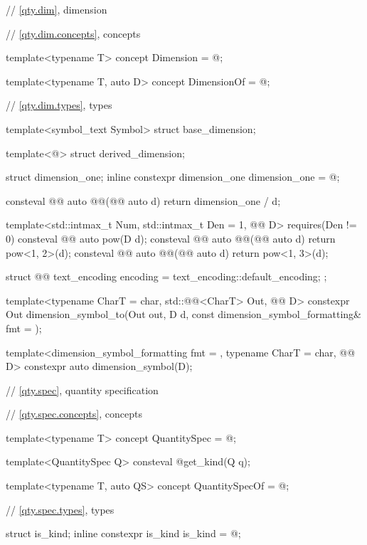 \begin{codeblock}
{// \ref{qty.dim}, dimension

// \ref{qty.dim.concepts}, concepts

template<typename T>
concept Dimension = @\seebelownc@;

template<typename T, auto D>
concept DimensionOf = @\seebelownc@;

// \ref{qty.dim.types}, types

template<symbol_text Symbol>
struct base_dimension;

template<@\seebelownc@>
struct derived_dimension;

struct dimension_one;
inline constexpr dimension_one dimension_one = @\seebelownc@;

consteval @@ auto @@(@@ auto d) { return dimension_one / d; }

template<std::intmax_t Num, std::intmax_t Den = 1, @@ D>
  requires(Den != 0)
consteval @@ auto pow(D d);
consteval @@ auto @@(@@ auto d) { return pow<1, 2>(d); }
consteval @@ auto @@(@@ auto d) { return pow<1, 3>(d); }

struct @@ {
  text_encoding encoding = text_encoding::default_encoding;
};

template<typename CharT = char, std::@@<CharT> Out, @@ D>
constexpr Out dimension_symbol_to(Out out, D d, const dimension_symbol_formatting& fmt = {});

template<dimension_symbol_formatting fmt = {}, typename CharT = char, @@ D>
constexpr auto dimension_symbol(D);

// \ref{qty.spec}, quantity specification

// \ref{qty.spec.concepts}, concepts

template<typename T>
concept QuantitySpec = @\seebelownc@;

template<QuantitySpec Q>
consteval @\seebelownc@ get_kind(Q q);

template<typename T, auto QS>
concept QuantitySpecOf = @\seebelownc@;

// \ref{qty.spec.types}, types

struct is_kind;
inline constexpr is_kind is_kind = @\seebelownc@;

}
\end{codeblock}
